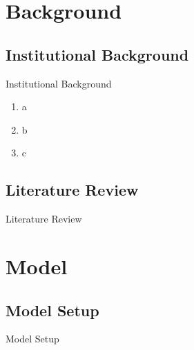 \documentclass[10pt]{beamer}
\begin{document}
\section{Background}

\subsection{Institutional Background}

\begin{frame}{Institutional Background}
\linespread{1.5}
\begin{enumerate}
	\item <1> a
	
	\item <2-> b

	\item <3> c
\end{enumerate}
\end{frame}



\subsection{Literature Review}

\begin{frame}{Literature Review}
\linespread{1.5}
\small 

\end{frame}


\section{Model}


\subsection{Model Setup}
\begin{frame}{Model Setup}
\small 

\end{frame}
\end{document}
